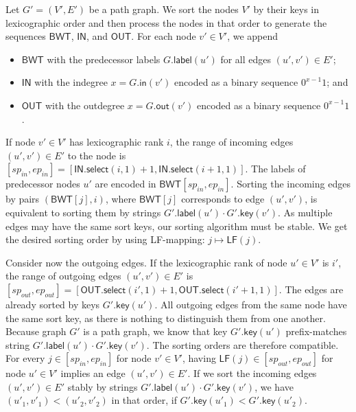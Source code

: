 \documentclass[a4paper,UKenglish]{lipics-v2016}
\newcommand{\select}{\ensuremath{\mathsf{select}}}
\newcommand{\LF}{\ensuremath{\mathsf{LF}}}
\newcommand{\gindegree}{\ensuremath{\mathsf{in}}}
\newcommand{\goutdegree}{\ensuremath{\mathsf{out}}}
\newcommand{\glabel}{\ensuremath{\mathsf{label}}}
\newcommand{\gkey}{\ensuremath{\mathsf{key}}}
\newcommand{\LFmapping}{LF\nobreakdash-mapping}
\newcommand{\BWT}{\ensuremath{\mathsf{BWT}}}
\newcommand{\bvIN}{\ensuremath{\mathsf{IN}}}
\newcommand{\bvOUT}{\ensuremath{\mathsf{OUT}}}
\begin{document}
Let $G' = (V', E')$ be a path graph. We sort the nodes $V'$ by their keys in lexicographic order and then process the nodes in that order to generate the sequences $\BWT$, $\bvIN$, and $\bvOUT$. For each node $v' \in V'$, we append
\begin{itemize}
\item $\BWT$ with the predecessor labels $G.\glabel(u')$ for all edges $(u', v') \in E'$;
\item $\bvIN$ with the indegree $x = G.\gindegree(v')$ encoded as a binary sequence $0^{x-1} 1$; and
\item $\bvOUT$ with the outdegree $x = G.\goutdegree(v')$ encoded as a binary sequence $0^{x-1} 1$.
\end{itemize}
If node $v' \in V'$ has lexicographic rank $i$, the range of incoming edges $(u', v') \in E'$ to the node is $[sp_{in}, ep_{in}] = [\bvIN.\select(i, 1) + 1, \bvIN.\select(i+1, 1)]$. The labels of predecessor nodes $u'$ are encoded in $\BWT[sp_{in}, ep_{in}]$. Sorting the incoming edges by pairs $(\BWT[j], i)$, where $\BWT[j]$ corresponds to edge $(u', v')$, is equivalent to sorting them by strings $G'.\glabel(u') \cdot G'.\gkey(v')$. As multiple edges may have the same sort keys, our sorting algorithm must be stable. We get the desired sorting order by using \LFmapping: $j \mapsto \LF(j)$.

Consider now the outgoing edges. If the lexicographic rank of node $u' \in V'$ is $i'$, the range of outgoing edges $(u', v') \in E'$ is $[sp_{out}, ep_{out}] = [\bvOUT.\select(i', 1) + 1, \bvOUT.\select(i'+1, 1)]$. The edges are already sorted by keys $G'.\gkey(u')$. All outgoing edges from the same node have the same sort key, as there is nothing to distinguish them from one another. Because graph $G'$ is a path graph, we know that key $G'.\gkey(u')$ prefix-matches string $G'.\glabel(u') \cdot G'.\gkey(v')$. The sorting orders are therefore compatible. For every $j \in [sp_{in}, ep_{in}]$ for node $v' \in V'$, having $\LF(j) \in [sp_{out}, ep_{out}]$ for node $u' \in V'$ implies an edge $(u', v') \in E'$. If we sort the incoming edges $(u', v') \in E'$ stably by strings $G'.\glabel(u') \cdot G'.\gkey(v')$, we have $(u'_{1}, v'_{1}) < (u'_{2}, v'_{2})$ in that order, if $G'.\gkey(u'_{1}) < G'.\gkey(u'_{2})$.
\end{document}
